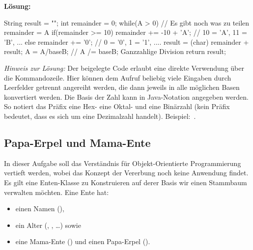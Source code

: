 \documentclass[table]{sopra-base}
\makeatletter
\let\T\texttt
\newenvironment{solution}{\null\par\noindent\textbf{\textcolor{sob@col@uulm@cs}{Lösung:}}\newline\bgroup\color{black}\slshape\ignorespaces}{\egroup}
\makeatother
\begin{document}
\begin{solution}
\begin{java}[firstnumber=81,morekeywords={[4]{ROM}}]
{    String result = "";
    int remainder = 0;
    while(A > 0) { // Es gibt noch was zu teilen
        remainder = A %
        if(remainder >= 10)
            remainder += -10 + 'A'; // 10 = 'A', 11 = 'B', ...
        else remainder += '0'; // 0 = '0', 1 = '1', ....
        result = (char) remainder + result;
        A = A/baseB; // A /= baseB; Ganzzahlige Division
    }
    return result;
}
\end{java}
    \textit{Hinweis zur Lösung:} Der beigelegte Code erlaubt eine direkte Verwendung über die Kommandozeile. Hier können dem Aufruf  beliebig viele Eingaben durch Leerfelder getrennt angereiht werden, die dann jeweils in alle möglichen Basen konvertiert werden. Die Basis der Zahl kann in Java-Notation angegeben werden. So notiert das Präfix \say{\T{0x}} eine Hex- \say{\T{0o}} eine Oktal- und \say{\T{0b}} eine Binärzahl (kein Präfix bedeutet, dass es sich um eine Dezimalzahl handelt). Beispiel:
    \,.
\end{solution}

\subsection{Papa-Erpel und Mama-Ente}

\label{sec:duckfamily}In dieser Aufgabe soll das Verständnis für Objekt-Orientierte Programmierung vertieft werden, wobei das Konzept der Vererbung noch keine Anwendung findet.
Es gilt eine Enten-Klasse zu Konstruieren auf derer Basis wir einen Stammbaum verwalten möchten. Eine Ente hat:
\begin{itemize}[nolistsep]
    \item einen Namen (),
    \item ein Alter (, , \ldots) sowie
    \item eine Mama-Ente () und einen Papa-Erpel ().
\end{itemize}
\end{document}
